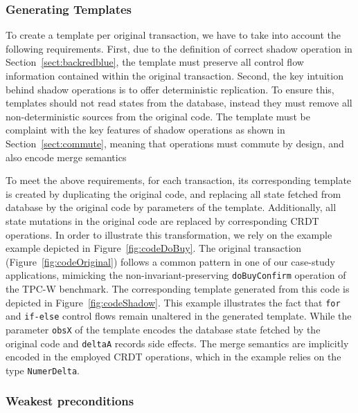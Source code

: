 \subsubsection{Generating Templates}
To create a template per original transaction, we have
to take into account the following requirements. First, due to the definition
of correct shadow operation in Section~\ref{sect:backredblue}, the template
must preserve all control flow information contained within the original transaction. 
Second, the key intuition behind shadow operations is to offer deterministic replication.
To ensure this, templates should not read states from the database, instead they must remove all non-deterministic sources 
from the original code. The template must be complaint with the key features of shadow operations
as shown in Section~\ref{sect:commute}, meaning that operations must commute by design, and also 
encode merge semantics %

To meet the above requirements, for each transaction, its corresponding template
is created by duplicating the original code, and replacing all state fetched from database
by the original code by parameters of the template. Additionally, all state mutations 
in the original code are replaced by corresponding CRDT operations. In order to illustrate this 
transformation, we rely on the example example depicted in Figure~\ref{fig:codeDoBuy}.
The original transaction (Figure~\ref{fig:codeOriginal}) follows
a common pattern in one of our case-study applications, mimicking
the non-invariant-preserving \texttt{doBuyConfirm} operation
of the TPC-W benchmark. The corresponding template generated from this code is depicted in Figure~\ref{fig:codeShadow}.
This example illustrates the fact that \texttt{for} and \texttt{if-else} control flows
remain unaltered in the generated template. While the parameter \texttt{obsX} of the template encodes the database state fetched by
the original code and \texttt{deltaA} records side effects. The merge semantics are implicitly encoded in the employed CRDT operations, which in the
example relies on the type \texttt{NumerDelta}. 

\subsubsection{Weakest preconditions}
\fi



